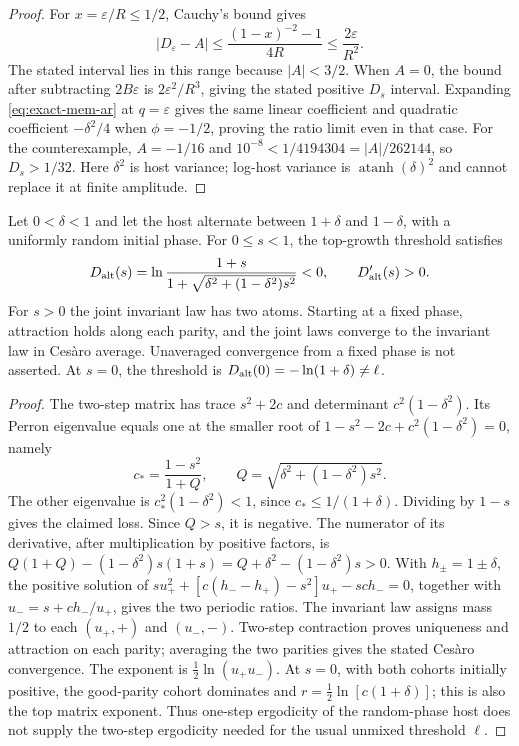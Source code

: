 \begin{proof}
For $x=\varepsilon/R\leq1/2$, Cauchy's bound gives
\begin{equation}
 |D_\varepsilon-A|
 \leq\frac{(1-x)^{-2}-1}{4R}\leq\frac{2\varepsilon}{R^2}.
 \label{eq:exact-mem-derivative-bound}
\end{equation}
The stated interval lies in this range because $|A|<3/2$.
When $A=0$, the bound after subtracting $2B\varepsilon$ is
$2\varepsilon^2/R^3$, giving the stated positive $D_s$ interval.
Expanding \eqref{eq:exact-mem-ar} at $q=\varepsilon$ gives the same
linear coefficient and quadratic coefficient $-\delta^2/4$ when
$\phi=-1/2$, proving the ratio limit even in that case.
For the counterexample, $A=-1/16$ and
$10^{-8}<1/4194304=|A|/262144$, so $D_s>1/32$.
Here $\delta^2$ is host variance; log-host variance is
$\operatorname{atanh}(\delta)^2$ and cannot replace it at finite amplitude.
\end{proof}

\begin{proposition}
\label{prop:exact-mem-alternating}
Let $0<\delta<1$ and let the host alternate between $1+\delta$ and
$1-\delta$, with a uniformly random initial phase. For $0\leq s<1$,
the top-growth threshold satisfies
\begin{equation}
 D_{\rm alt}(s)=\ln\frac{1+s}{1+\sqrt{\delta^2+(1-\delta^2)s^2}}<0,
 \qquad D_{\rm alt}'(s)>0.
 \label{eq:exact-mem-alternating}
\end{equation}
For $s>0$ the joint invariant law has two atoms. Starting at a fixed
phase, attraction holds along each parity, and the joint laws converge
to the invariant law in Ces\`aro average. Unaveraged convergence from
a fixed phase is not asserted. At $s=0$, the threshold is
$D_{\rm alt}(0)=-\ln(1+\delta)\ne\ell$.
\end{proposition}

\begin{proof}
The two-step matrix has trace $s^2+2c$ and determinant
$c^2(1-\delta^2)$. Its Perron eigenvalue equals one at the smaller
root of $1-s^2-2c+c^2(1-\delta^2)=0$, namely
\begin{equation}
 c_* =\frac{1-s^2}{1+Q},\qquad
 Q=\sqrt{\delta^2+(1-\delta^2)s^2}.
 \label{eq:exact-mem-alt-root}
\end{equation}
The other eigenvalue is $c_*^2(1-\delta^2)<1$, since
$c_*\leq1/(1+\delta)$. Dividing by $1-s$ gives the claimed loss.
Since $Q>s$, it is negative. The numerator of its derivative, after
multiplication by positive factors, is
$Q(1+Q)-(1-\delta^2)s(1+s)=Q+\delta^2-(1-\delta^2)s>0$.
With $h_\pm=1\pm\delta$, the positive solution of
$s u_+^2+[c(h_--h_+)-s^2]u_+-sc h_-=0$, together with
$u_-=s+c h_-/u_+$, gives the two periodic ratios.
The invariant law assigns mass $1/2$ to each $(u_+,+)$ and $(u_-,-)$.
Two-step contraction proves uniqueness and attraction on each parity;
averaging the two parities gives the stated Ces\`aro convergence.
The exponent is $\tfrac12\ln(u_+u_-)$.
At $s=0$, with both cohorts initially positive, the good-parity cohort
dominates and $r=\tfrac12\ln[c(1+\delta)]$; this is also the top
matrix exponent. Thus one-step ergodicity of the random-phase host
does not supply the two-step ergodicity needed for the usual unmixed
threshold $\ell$.
\end{proof}

